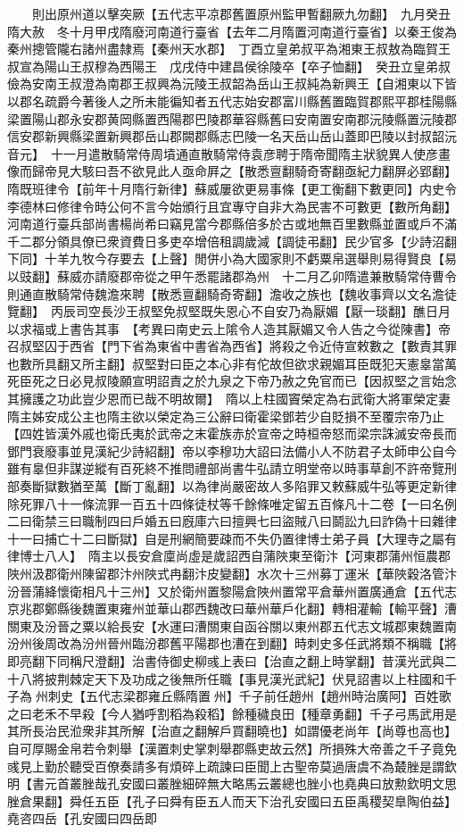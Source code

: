 　　則出原州道以擊突厥【五代志平凉郡舊置原州監甲暫翻厥九勿翻】　九月癸丑隋大赦　冬十月甲戌隋廢河南道行臺省【去年二月隋置河南道行臺省】以秦王俊為秦州摠管隴右諸州盡隸焉【秦州天水郡】　丁酉立皇弟叔平為湘東王叔敖為臨賀王叔宣為陽山王叔穆為西陽王　戊戌侍中建昌侯徐陵卒【卒子恤翻】　癸丑立皇弟叔儉為安南王叔澄為南郡王叔興為沅陵王叔韶為岳山王叔純為新興王【自湘東以下皆以郡名疏爵今著後人之所未能徧知者五代志始安郡富川縣舊置臨賀郡熙平郡桂陽縣梁置陽山郡永安郡黄岡縣置西陽郡巴陵郡華容縣舊曰安南置安南郡沅陵縣置沅陵郡信安郡新興縣梁置新興郡岳山郡闕郡縣志巴陵一名天岳山岳山蓋即巴陵以封叔韶沅音元】　十一月遣散騎常侍周墳通直散騎常侍袁彦聘于隋帝聞隋主狀貌異人使彦畫像而歸帝見大駭曰吾不欲見此人亟命屛之【散悉亶翻騎奇寄翻亟紀力翻屏必郢翻】　隋既班律令【前年十月隋行新律】蘇威屢欲更易事條【更工衡翻下數更同】内史令李德林曰修律令時公何不言今始頒行且宜專守自非大為民害不可數更【數所角翻】河南道行臺兵部尚書楊尚希曰竊見當今郡縣倍多於古或地無百里數縣並置或戶不滿千二郡分領具僚已衆資費日多吏卒增倍租調歲減【調徒弔翻】民少官多【少詩沼翻下同】十羊九牧今存要去【上聲】閒併小為大國家則不虧粟帛選舉則易得賢良【易以豉翻】蘇威亦請廢郡帝從之甲午悉罷諸郡為州　十二月乙卯隋遣兼散騎常侍曹令則通直散騎常侍魏澹來聘【散悉亶翻騎奇寄翻】澹收之族也【魏收事齊以文名澹徒覽翻】　丙辰司空長沙王叔堅免叔堅既失恩心不自安乃為厭媚【厭一琰翻】醮日月以求福或上書告其事　【考異曰南史云上隂令人造其厭媚又令人告之今從陳書】帝召叔堅囚于西省【門下省為東省中書省為西省】將殺之令近侍宣敕數之【數責其罪也數所具翻又所主翻】叔堅對曰臣之本心非有佗故但欲求親媚耳臣既犯天憲辠當萬死臣死之日必見叔陵願宣明詔責之於九泉之下帝乃赦之免官而已【因叔堅之言始念其擁護之功此豈少恩而已哉不明故爾】　隋以上柱國竇榮定為右武衛大將軍榮定妻隋主姊安成公主也隋主欲以榮定為三公辭曰衛霍梁鄧若少自貶損不至覆宗帝乃止【四姓皆漢外戚也衛氏夷於武帝之末霍族赤於宣帝之時桓帝怒而梁宗誅滅安帝長而鄧門衰廢事並見漢紀少詩紹翻】帝以李穆功大詔曰法備小人不防君子太師申公自今雖有辠但非謀逆縱有百死終不推問禮部尚書牛弘請立明堂帝以時事草創不許帝覽刑部奏斷獄數猶至萬【斷丁亂翻】以為律尚嚴密故人多陷罪又敕蘇威牛弘等更定新律除死罪八十一條流罪一百五十四條徒杖等千餘條唯定留五百條凡十二卷【一曰名例二曰衛禁三曰職制四曰戶婚五曰廐庫六曰擅興七曰盜賊八曰鬬訟九曰詐偽十曰雜律十一曰捕亡十二曰斷獄】自是刑網簡要疎而不失仍置律博士弟子員【大理寺之屬有律博士八人】　隋主以長安倉廩尚虛是歲詔西自蒲陜東至衛汴【河東郡蒲州恒農郡陜州汲郡衛州陳留郡汴州陜式冉翻汴皮變翻】水次十三州募丁運米【華陜穀洛管汴汾晉蒲絳懷衛相凡十三州】又於衛州置黎陽倉陜州置常平倉華州置廣通倉【五代志京兆郡鄭縣後魏置東雍州並華山郡西魏改曰華州華戶化翻】轉相灌輸【輸平聲】漕關東及汾晉之粟以給長安【水運曰漕關東自函谷關以東州郡五代志文城郡東魏置南汾州後周改為汾州晉州臨汾郡舊平陽郡也漕在到翻】時刺史多任武將類不稱職【將即亮翻下同稱尺澄翻】治書侍御史柳彧上表曰【治直之翻上時掌翻】昔漢光武與二十八將披荆棘定天下及功成之後無所任職【事見漢光武紀】伏見詔書以上柱國和千子為州刺史【五代志梁郡雍丘縣隋置州】千子前任趙州【趙州時治廣阿】百姓歌之曰老禾不早殺【今人猶呼割稻為殺稻】餘種穢良田【種章勇翻】千子弓馬武用是其所長治民涖衆非其所解【治直之翻解戶買翻曉也】如謂優老尚年【尚尊也高也】自可厚賜金帛若令刺舉【漢置刺史掌刺舉郡縣吏故云然】所損殊大帝善之千子竟免彧見上勤於聽受百僚奏請多有煩碎上疏諫曰臣聞上古聖帝莫過唐虞不為樷脞是謂欽明【書元首叢脞哉孔安國曰叢脞細碎無大略馬云叢總也脞小也堯典曰放勲欽明文思脞倉果翻】舜任五臣【孔子曰舜有臣五人而天下治孔安國曰五臣禹稷契臯陶伯益】堯咨四岳【孔安國曰四岳即
